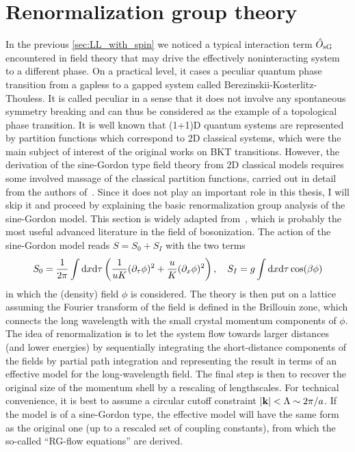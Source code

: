 \section{Renormalization group theory}
\label{sec:renormalization_group_theory}
In the previous \cref{sec:LL_with_spin} we noticed a typical interaction term $\hat O_{\rm sG}$ encountered in field theory that may drive the effectively noninteracting system to a different phase.
On a practical level, it cases a peculiar quantum phase transition from a gapless to a gapped system called Berezinskii-Kosterlitz-Thouless.
It is called peculiar in a sense that it does not involve any spontaneous symmetry breaking and can thus be considered as the example of a topological phase transition.
It is well known that (1+1)D quantum systems are represented by partition functions which correspond to 2D classical systems, which were the main subject of interest of the original works on BKT transitions.
However, the derivation of the sine-Gordon type field theory from 2D classical models requires some involved massage of the classical partition functions, carried out in detail from the authors of~\cite{AltlandSimons2010}.
Since it does not play an important role in this thesis, I will skip it and proceed by explaining the basic renormalization group analysis of the sine-Gordon model.
This section is widely adapted from~\cite{Gogolin2004}, which is probably the most useful advanced literature in the field of bosonization.
The action of the sine-Gordon model reads $S = S_0 + S_I$ with the two terms
\begin{align}
    S_0 = \frac1{2\pi}\int\mathrm d x\mathrm d\tau\left( \frac1{uK}(\partial_\tau\phi)^2 + \frac uK (\partial_x\phi)^2 \right),
    \quad
    S_I = g\int\mathrm d x\mathrm d\tau\cos(\beta\phi)
\end{align}
in which the (density) field $\phi$ is considered.
The theory is then put on a lattice assuming the Fourier transform of the field is defined in the Brillouin zone, which connects the long wavelength with the small crystal momentum components of $\phi$.
The idea of renormalization is to let the system flow towards larger distances (and lower energies) by sequentially integrating the short-distance components of the fields by partial path integration and representing the result in terms of an effective model for the long-wavelength field.
The final step is then to recover the original size of the momentum shell by a rescaling of lengthscales.
For technical convenience, it is best to assume a circular cutoff constraint $|{\bf k}|<\Lambda\sim2\pi/a$.
If the model is of a sine-Gordon type, the effective model will have the same form as the original one (up to a rescaled set of coupling constants), from which the so-called ``RG-flow equations'' are derived.
\\

